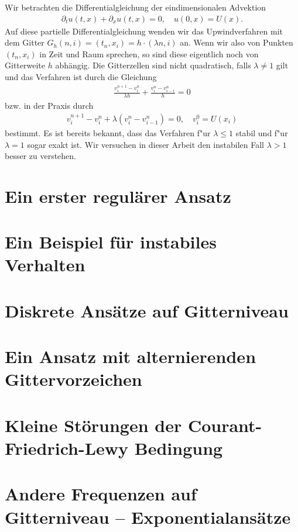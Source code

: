 
Wir betrachten die Differentialgleichung der eindimensionalen Advektion
\begin{align}\label{eq:adv:pde}
\partial_t u(t, x) + \partial_x u(t, x) = 0, \quad u(0, x) = U(x).
\end{align}
Auf diese partielle Differentialgleichung wenden wir das Upwindverfahren mit dem Gitter $G_h(n,i) = (t_n, x_i) = h \cdot (\lambda n, i)$ an.
Wenn wir also von Punkten $(t_n, x_i)$ in Zeit und Raum sprechen, so sind diese eigentlich noch von Gitterweite $h$ abhängig. 
Die Gitterzellen sind nicht quadratisch, falls $\lambda \neq 1$ gilt und das Verfahren ist durch die Gleichung
\begin{align}\label{eq:adv:scheme_rechnung}
\frac {v^{n+1}_i - v^n_i} {\lambda h} + \frac {v^n_i - v^n_{i-1}} h = 0
\end{align}
bzw. in der Praxis durch
\begin{align}\label{eq:adv:scheme}
v^{n+1}_i - v^n_i + \lambda (v^n_i - v^n_{i-1}) = 0, \quad v^0_i = U(x_i)
\end{align}
bestimmt.
Es ist bereits bekannt, dass das Verfahren f"ur $\lambda \leq 1$ stabil und f"ur $\lambda = 1$ sogar exakt ist.
Wir versuchen in dieser Arbeit den instabilen Fall $\lambda > 1$ besser zu verstehen.

\section{Ein erster regulärer Ansatz}\label{sec:regulaer}



\section{Ein Beispiel für instabiles Verhalten}\label{sec:transport:beispiel}



\section {Diskrete Ansätze auf Gitterniveau} \label{sec:transport:diskret}



\section {Ein Ansatz mit alternierenden Gittervorzeichen}\label{sec:transport:osz}



\section{Kleine Störungen der Courant-Friedrich-Lewy Bedingung}\label{sec:transport:kleineta}



\section{Andere Frequenzen auf Gitterniveau -- Exponentialansätze}

